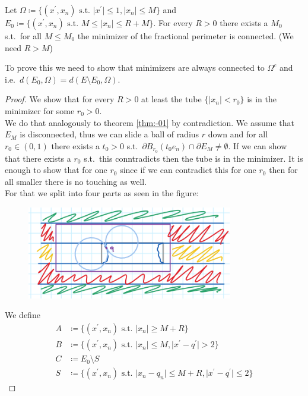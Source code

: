 \begin{theorem}
	\label{thm:-03}
	Let \( \Omega \coloneqq \{(x^\prime, x_n) \text{ s.t. } \lvert x^\prime \rvert \leq 1,
	\lvert x_n \rvert \leq M \} \) and \( E_0 \coloneqq \{ (x^\prime, x_n) \text{ s.t. } M
	\leq \lvert x_n \rvert \leq R+M \} \). For every \( R > 0 \) there exists a \( M_0 \)
	s.t.\ for all \( M \leq M_0 \) the minimizer of the fractional perimeter is connected.
	(We need \( R > M \))
\end{theorem}
\begin{note}
	To prove this we need to show that minimizers are always connected to \( \Omega^c \)
	and i.e.\ \( d(E_0, \Omega) = d(E\setminus E_0, \Omega) \).
\end{note}
\begin{proof}
	We show that for every \( R > 0 \) at least the tube \( \{ \lvert x_n \rvert < r_0 \}
	\) is in the minimizer for some \( r_0 > 0 \). \\
	We do that analogously to theorem \cref{thm:-01} by contradiction. We assume that \(
	E_M \) is disconnected, thus we can slide a ball of radius \( r \) down and for all \(
	r_0 \in (0,1) \) there exists a \( t_0 > 0 \) s.t.\ \( \partial B_{r_0}(t_0 e_n) \cap
	\partial E_M \neq \emptyset \). If we can show that there exists a \( r_0 \) s.t.\
	this conntradicts then the tube is in the minimizer. It is enough to show that for one
	\( r_0 \) since if we can contradict this for one \( r_0 \) then for all smaller there
	is no touching as well. \\
	For that we split into four parts as seen in the figure:
	\begin{figure}[h]
		\centering
		\includegraphics[width = 0.8\textwidth]{figures/Screenshot_20240107_160324.png}
		\caption{}
		\label{fig:-02}
	\end{figure}
	\par
	We define
	\begin{align*}
		A & \coloneqq \{(x^\prime,x_n) \text{ s.t. } \lvert x_n \rvert \geq M+R \} \\
		B & \coloneqq \{(x^\prime,x_n) \text{ s.t. } \lvert x_n \rvert \leq M, \lvert x^\prime -q^\prime \rvert > 2 \} \\
		C & \coloneqq E_0 \setminus S \\
		S & \coloneqq \{ (x^\prime,x_n) \text{ s.t. } \lvert x_n - q_n \rvert \leq M+R, \lvert x^\prime -q^\prime \rvert \leq 2\}
	\end{align*}


\end{proof}
